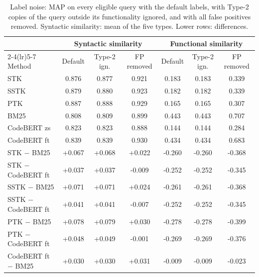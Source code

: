 \begin{table}[!htbp]
\centering
\caption{Label noise: MAP on every eligible query with the default labels, with Type-2 copies of the query outside its functionality ignored, and with all false positives removed. Syntactic similarity: mean of the five types. Lower rows: differences.}
\label{tab:noise}
\footnotesize
\setlength{\tabcolsep}{3.5pt}
\begin{tabular}{lcccccc}
\toprule
 & \multicolumn{3}{c}{Syntactic similarity} & \multicolumn{3}{c}{Functional similarity} \\
\cmidrule(lr){2-4}\cmidrule(lr){5-7}
Method & Default & Type-2 ign. & FP removed & Default & Type-2 ign. & FP removed \\
\midrule
STK & 0.876 & 0.877 & 0.921 & 0.183 & 0.183 & 0.339 \\
SSTK & 0.879 & 0.880 & 0.923 & 0.182 & 0.182 & 0.339 \\
PTK & 0.887 & 0.888 & 0.929 & 0.165 & 0.165 & 0.307 \\
BM25 & 0.808 & 0.809 & 0.899 & 0.443 & 0.443 & 0.707 \\
CodeBERT zs & 0.823 & 0.823 & 0.888 & 0.144 & 0.144 & 0.284 \\
CodeBERT ft & 0.839 & 0.839 & 0.930 & 0.434 & 0.434 & 0.683 \\
\midrule
STK $-$ BM25 & +0.067 & +0.068 & +0.022 & -0.260 & -0.260 & -0.368 \\
STK $-$ CodeBERT ft & +0.037 & +0.037 & -0.009 & -0.252 & -0.252 & -0.345 \\
SSTK $-$ BM25 & +0.071 & +0.071 & +0.024 & -0.261 & -0.261 & -0.368 \\
SSTK $-$ CodeBERT ft & +0.041 & +0.041 & -0.007 & -0.252 & -0.252 & -0.345 \\
PTK $-$ BM25 & +0.078 & +0.079 & +0.030 & -0.278 & -0.278 & -0.399 \\
PTK $-$ CodeBERT ft & +0.048 & +0.049 & -0.001 & -0.269 & -0.269 & -0.376 \\
CodeBERT ft $-$ BM25 & +0.030 & +0.030 & +0.031 & -0.009 & -0.009 & -0.023 \\
\bottomrule
\end{tabular}
\end{table}
